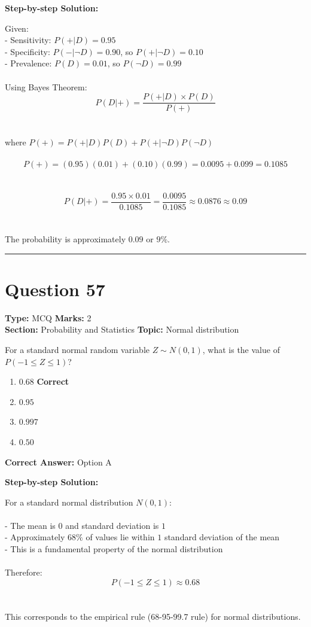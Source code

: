\documentclass[11pt]{article}
\begin{document}
\textbf{Step-by-step Solution:}

Given:\\
- Sensitivity: \(P(+|D) = 0.95\)\\
- Specificity: \(P(-|\neg D) = 0.90\), so \(P(+|\neg D) = 0.10\)\\
- Prevalence: \(P(D) = 0.01\), so \(P(\neg D) = 0.99\)\\
\\
Using Bayes Theorem:\\
\[P(D|+) = \frac{P(+|D) \times P(D)}{P(+)}\]\\
\\
where \(P(+) = P(+|D)P(D) + P(+|\neg D)P(\neg D)\)\\
\\
\[P(+) = (0.95)(0.01) + (0.10)(0.99) = 0.0095 + 0.099 = 0.1085\]\\
\\
\[P(D|+) = \frac{0.95 \times 0.01}{0.1085} = \frac{0.0095}{0.1085} \approx 0.0876 \approx 0.09\]\\
\\
The probability is approximately \(0.09\) or \(9\%\).

\vspace{0.8em}
\hrule
\vspace{0.4em}
\section*{Question 57}
\textbf{Type:} MCQ \hfill \textbf{Marks:} 2\\
\textbf{Section:} Probability and Statistics \hfill \textbf{Topic:} Normal distribution

For a standard normal random variable \(Z \sim N(0,1)\), what is the value of \(P(-1 \leq Z \leq 1)\)?


\begin{enumerate}[label=\textbf{\Alph*.}, leftmargin=1.8em]
\item \(0.68\) \hfill {\color{gategreen}\textbf{Correct}}\item \(0.95\)\item \(0.997\)\item \(0.50\)\end{enumerate}

\textbf{Correct Answer:} Option A

\textbf{Step-by-step Solution:}

For a standard normal distribution \(N(0,1)\):\\
\\
- The mean is \(0\) and standard deviation is \(1\)\\
- Approximately \(68\%\) of values lie within \(1\) standard deviation of the mean\\
- This is a fundamental property of the normal distribution\\
\\
Therefore:\\
\[P(-1 \leq Z \leq 1) \approx 0.68\]\\
\\
This corresponds to the empirical rule (68-95-99.7 rule) for normal distributions.
\end{document}
